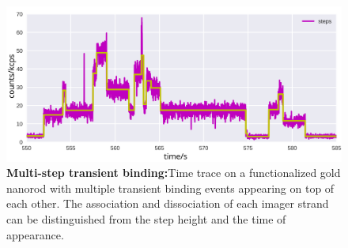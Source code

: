 \begin{figure}[ht]
  \centering
  \includegraphics[width=\textwidth]{step_timetrace}
  \makeatletter
  \renewcommand{\fnum@figure}{\figurename~S\thefigure}
  \makeatother
  \caption{\textbf{Multi-step transient binding:}Time trace on a functionalized gold nanorod with multiple transient binding events appearing on top of each other.
  The association and dissociation of each imager strand can be distinguished from the step height and the time of appearance. }
  \label{SIfig: step_transbind}
\end{figure}

